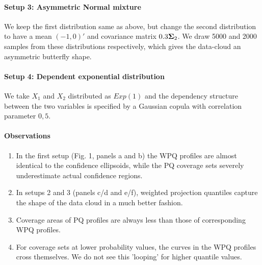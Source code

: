 \documentclass[10pt]{article}
\begin{document}
\begin{multicols}{2}
\paragraph{Setup 3: Asymmetric Normal mixture}We keep the first distribution same as above, but change the second distribution to have a mean $(-1,0)'$ and covariance matrix $0.3{\boldsymbol{\Sigma}}_2$. We draw 5000 and 2000 samples from these distributions respectively, which gives the data-cloud an asymmetric butterfly shape.

\paragraph{Setup 4: Dependent exponential distribution}We take $X_1$ and $X_2$ distributed as $Exp(1)$ and the dependency structure between the two variables is specified by a Gaussian copula with correlation parameter $0,5$.

\paragraph{Observations}
\begin{enumerate}
\item In the first setup (Fig. 1, panels a and b) the WPQ profiles are almost identical to the confidence ellipsoids, while the PQ coverage sets severely underestimate actual confidence regions.
\item In setups 2 and 3 (panels c/d and e/f), weighted projection quantiles capture the shape of the data cloud in a much better fashion.
\item Coverage areas of PQ profiles are always less than those of corresponding WPQ profiles.
\item For coverage sets at lower probability values, the curves in the WPQ profiles cross themselves. We do not see this 'looping' for higher quantile values.
\end{enumerate}
\end{multicols}
\end{document}
